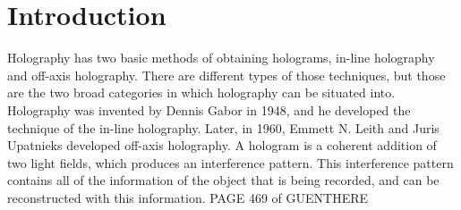 %
%

\chapter{Introduction} \label{chap:Intro}

Holography has two basic methods of obtaining holograms, in-line holography and
off-axis holography. There are different types of those techniques, but those
are the two broad categories in which holography can be situated into.
Holography was invented by Dennis Gabor in 1948, and he developed the technique
of the in-line holography. Later, in 1960, Emmett N. Leith and Juris Upatnieks developed
off-axis holography.
A hologram is a coherent addition of two light fields, which produces an
interference pattern. This interference pattern contains all of the information
of the object that is being recorded, and can be reconstructed with this
information.
PAGE 469 of GUENTHERE


